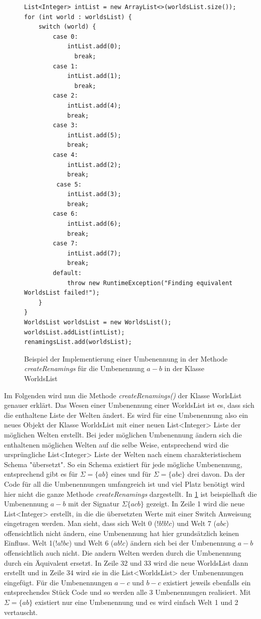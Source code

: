 \documentclass[12pt,a4paper]{article}
\begin{document}
\begin{figure}
\begin{lstlisting}
List<Integer> intList = new ArrayList<>(worldsList.size());
for (int world : worldsList) {
    switch (world) {
        case 0:
            intList.add(0);
              break;
        case 1:
            intList.add(1);
              break;
        case 2:
            intList.add(4);
            break;
        case 3:
            intList.add(5);
            break;
        case 4:
            intList.add(2);
            break;
         case 5:
            intList.add(3);
            break;
        case 6:
            intList.add(6);
            break;
        case 7:
            intList.add(7);
            break;
        default:
            throw new RuntimeException("Finding equivalent WorldsList failed!");
    }
}
WorldsList worldsList = new WorldsList();
worldsList.addList(intList);
renamingsList.add(worldsList);
\end{lstlisting}
\caption{Beispiel der Implementierung einer Umbenennung in der Methode \textit{createRenamings} für die Umbenennung $a-b$ in der Klasse WorldsList}
\label{code:renaming}
\end{figure}


Im Folgenden wird nun die Methode \textit{createRenamings()} der Klasse WorlsList genauer erklärt. Das Wesen einer Umbenennung einer WorldsList ist es, dass sich die enthaltene Liste der Welten ändert. Es wird für eine Umbenennung also ein neues Objekt der Klasse WorldsList mit einer neuen List<Integer> Liste der möglichen Welten erstellt. Bei jeder möglichen Umbenennung ändern sich die enthaltenen möglichen Welten auf die selbe Weise, entsprechend wird die ursprüngliche List<Integer> Liste der Welten nach einem charakteristischem Schema "übersetzt". So ein Schema existiert für jede mögliche Umbenennung, entsprechend gibt es für $\Sigma=\{ab\}$ eines und für $\Sigma=\{abc\}$ drei davon. Da der Code für all die Umbenennungen umfangreich ist und viel Platz benötigt wird hier nicht die ganze Methode \textit{createRenamings} dargestellt. In \ref{code:renaming} ist beispielhaft die Umbenennung $a-b$ mit der Signatur $\Sigma\{acb\}$ gezeigt. In Zeile 1 wird die neue List<Integer> erstellt, in die die übersetzten Werte mit einer Switch Anweisung eingetragen werden. Man sieht, dass sich  Welt 0 ($!b!b!c$) und Welt 7 ($abc$) offensichtlich nicht ändern, eine Umbenennung hat hier grundsätzlich keinen Einfluss. Welt 1($!a!bc$) und Welt 6 ($ab!c$) ändern sich bei der Umbenennung $a-b$ offensichtlich auch nicht. Die andern Welten werden durch die Umbenennung durch ein Äquivalent ersetzt. In Zeile 32 und 33 wird die neue WorldsList dann erstellt und in Zeile 34 wird sie in die List<WorldsList> der Umbenennungen eingefügt.  Für die Umbenennungen $a-c$ und $b-c$ existiert jeweils ebenfalls ein entsprechendes Stück Code und so werden alle 3 Umbenennungen realisiert. Mit $ \Sigma=\{ab\}$ existiert nur eine Umbenennung und es wird einfach Welt 1 und 2 vertauscht.
\end{document}
